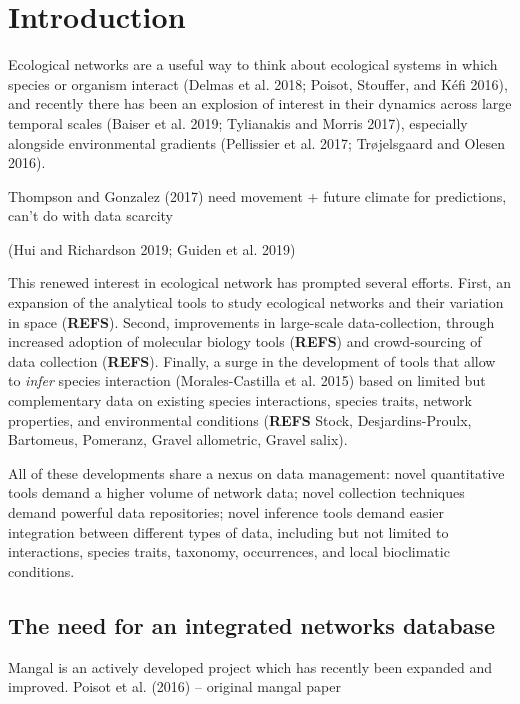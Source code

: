 \hypertarget{introduction}{%
\section{Introduction}\label{introduction}}

Ecological networks are a useful way to think about ecological systems
in which species or organism interact (Delmas et al. 2018; Poisot,
Stouffer, and Kéfi 2016), and recently there has been an explosion of
interest in their dynamics across large temporal scales (Baiser et al.
2019; Tylianakis and Morris 2017), especially alongside environmental
gradients (Pellissier et al. 2017; Trøjelsgaard and Olesen 2016).

Thompson and Gonzalez (2017) need movement + future climate for
predictions, can't do with data scarcity

(Hui and Richardson 2019; Guiden et al. 2019)

This renewed interest in ecological network has prompted several
efforts. First, an expansion of the analytical tools to study ecological
networks and their variation in space (\textbf{REFS}). Second,
improvements in large-scale data-collection, through increased adoption
of molecular biology tools (\textbf{REFS}) and crowd-sourcing of data
collection (\textbf{REFS}). Finally, a surge in the development of tools
that allow to \emph{infer} species interaction (Morales-Castilla et al.
2015) based on limited but complementary data on existing species
interactions, species traits, network properties, and environmental
conditions (\textbf{REFS} Stock, Desjardins-Proulx, Bartomeus, Pomeranz,
Gravel allometric, Gravel salix).

All of these developments share a nexus on data management: novel
quantitative tools demand a higher volume of network data; novel
collection techniques demand powerful data repositories; novel inference
tools demand easier integration between different types of data,
including but not limited to interactions, species traits, taxonomy,
occurrences, and local bioclimatic conditions.

\hypertarget{the-need-for-an-integrated-networks-database}{%
\subsection{The need for an integrated networks
database}\label{the-need-for-an-integrated-networks-database}}

Mangal is an actively developed project which has recently been expanded
and improved. Poisot et al. (2016) -- original mangal paper


